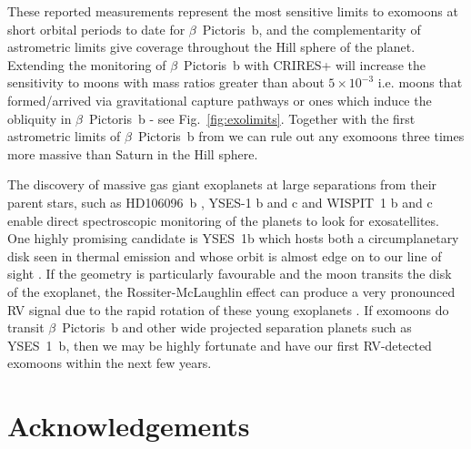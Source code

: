 \documentclass[fleqn,usenatbib]{mnras}
\newcommand{\bpb}{$\beta$~Pictoris~b}
\begin{document}
These reported measurements represent the most sensitive limits to exomoons at short orbital periods to date for \bpb{}, and the complementarity of astrometric limits give coverage throughout the Hill sphere of the planet.
%
Extending the monitoring of \bpb{} with CRIRES+ will increase the sensitivity to moons with mass ratios greater than about $5\times10^{-3}$ i.e. moons that formed/arrived via gravitational capture pathways or ones which induce the obliquity in \bpb{} \citep{Poon24} - see Fig.~\ref{fig:exolimits}.
%
Together with the first astrometric limits of \bpb{} from \citet{Macias26} we can rule out any exomoons three times more massive than Saturn in the Hill sphere.

%                                                    
%                                           

The discovery of massive gas giant exoplanets at large separations from their parent stars, such as HD106096~b \citep{Bailey14}, YSES-1 b and c \citep{Bohn20} and WISPIT~1 b and c \citep{vanCapelleveen25b} enable direct spectroscopic monitoring of the planets to look for exosatellites.
%
One highly promising candidate is YSES~1b which hosts both a circumplanetary disk seen in thermal emission \citep{Hoch25} and whose orbit is almost edge on to our line of sight \citep{Roberts25}.
%
If the geometry is particularly favourable and the moon transits the disk of the exoplanet, the Rossiter-McLaughlin effect can produce a very pronounced RV signal due to the rapid rotation of these young exoplanets \citep{Ruffio23}.
%
If exomoons do transit \bpb{} and other wide projected separation planets such as YSES~1~b, then we may be highly fortunate and have our first RV-detected exomoons within the next few years.

\section*{Acknowledgements}
\end{document}
